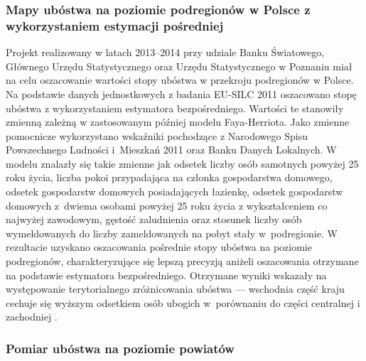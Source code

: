 \subsubsection*{Mapy ubóstwa na poziomie podregionów w Polsce z wykorzystaniem estymacji pośredniej}

Projekt realizowany w latach 2013--2014 przy udziale Banku Światowego, Głównego Urzędu Statystycznego oraz Urzędu Statystycznego w Poznaniu miał na celu oszacowanie wartości stopy ubóstwa w przekroju podregionów w Polsce. Na podstawie danych jednostkowych z badania EU-SILC 2011 oszacowano stopę ubóstwa z wykorzystaniem estymatora bezpośredniego. Wartości te stanowiły zmienną zależną w zastosowanym później modelu Faya-Herriota. Jako zmienne pomocnicze wykorzystano wskaźniki pochodzące z Narodowego Spisu Powszechnego Ludności i~Mieszkań 2011 oraz Banku Danych Lokalnych. W modelu znalazły się takie zmienne jak odsetek liczby osób samotnych powyżej 25 roku życia, liczba pokoi przypadająca na członka gospodarstwa domowego, odsetek gospodarstw domowych posiadających łazienkę, odsetek gospodarstw domowych z~dwiema osobami powyżej 25 roku życia z wykształceniem co najwyżej zawodowym, gęstość zaludnienia oraz stosunek liczby osób wymeldowanych do liczby zameldowanych na pobyt stały w~podregionie. W rezultacie uzyskano oszacowania pośrednie stopy ubóstwa na poziomie podregionów, charakteryzujące się lepszą precyzją aniżeli oszacowania otrzymane na podstawie estymatora bezpośredniego. Otrzymane wyniki wskazały na występowanie terytorialnego zróżnicowania ubóstwa --- wschodnia część kraju cechuje się wyższym odsetkiem osób ubogich w~porównaniu do części centralnej i zachodniej \citep{mapowanie2014}.

\subsubsection*{Pomiar ubóstwa na poziomie powiatów}

